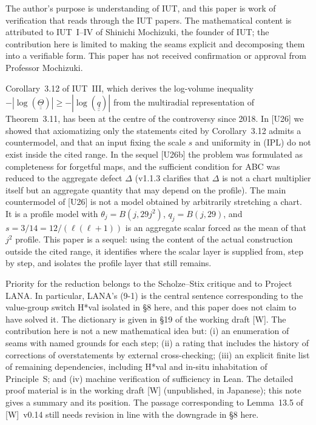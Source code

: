 \documentclass[11pt]{article}
\newcommand{\uu}[1]{\underline{\underline{#1}}}
\begin{document}
The author's purpose is understanding of IUT, and this paper is work
of verification that reads through the IUT papers.  The mathematical
content is attributed to IUT~I--IV of Shinichi Mochizuki, the
founder of IUT; the contribution here is limited to making the seams
explicit and decomposing them into a verifiable form.  This paper
has not received confirmation or approval from Professor Mochizuki.

Corollary~3.12 of IUT~III, which derives the log-volume inequality
$-|\log(\uu\Theta)|\ge-|\log(\uu q)|$ from the multiradial
representation of Theorem~3.11, has been at the centre of the
controversy since 2018.  In [U26] we showed that axiomatizing only
the statements cited by Corollary~3.12 admits a countermodel, and
that an input fixing the scale $s$ and uniformity in (IPL) do not
exist inside the cited range.  In the sequel [U26b] the problem was
formulated as completeness for forgetful maps, and the sufficient
condition for ABC was reduced to the aggregate defect $\Delta$
(v1.1.3 clarifies that $\Delta$ is not a chart multiplier itself but
an aggregate quantity that may depend on the profile).  The main
countermodel of [U26] is not a model obtained by arbitrarily
stretching a chart.  It is a profile model with
$\theta_j=B(j,29j^2)$, $q_j=B(j,29)$, and
$s=3/14=12/(\ell(\ell+1))$ is an aggregate scalar forced as the mean
of that $j^2$ profile.  This paper is a sequel: using the content
of the actual construction outside the cited range, it identifies
where the scalar layer is supplied from, step by step, and isolates
the profile layer that still remains.

Priority for the reduction belongs to the Scholze--Stix critique and
to Project LANA.  In particular, LANA's (9-1) is the central
sentence corresponding to the value-group switch H*val isolated in
\S8 here, and this paper does not claim to have solved it.  The
dictionary is given in \S19 of the working draft [W].  The
contribution here is not a new mathematical idea but: (i) an
enumeration of seams with named grounds for each step; (ii) a rating
that includes the history of corrections of overstatements by
external cross-checking; (iii) an explicit finite list of remaining
dependencies, including H*val and in-situ inhabitation of
Principle~S; and (iv) machine verification of sufficiency in Lean.
The detailed proof material is in the working draft [W]
(unpublished, in Japanese); this note gives a summary and its position.  The
passage corresponding to Lemma~13.5 of [W]~v0.14 still needs
revision in line with the downgrade in \S8 here.
\end{document}
